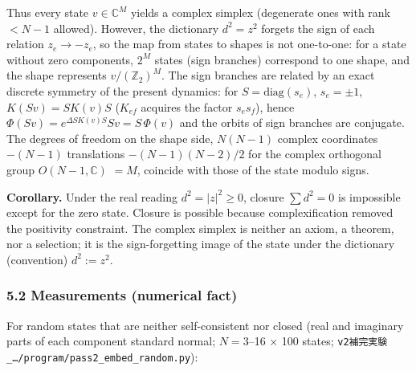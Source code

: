 \documentclass[
  10pt,
  a4paper,
]{article}
\begin{document}
Thus every state \(v\in\mathbb C^M\) yields a complex simplex
(degenerate ones with rank \(<N-1\) allowed). However, the dictionary
\(d^2=z^2\) forgets the sign of each relation \(z_e\to-z_e\), so the map
from states to shapes is not one-to-one: for a state without zero
components, \(2^M\) states (sign branches) correspond to one shape, and
the shape represents \(v/(\mathbb Z_2)^M\). The sign branches are
related by an exact discrete symmetry of the present dynamics: for
\(S=\mathrm{diag}(s_e)\), \(s_e=\pm1\), \(K(Sv)=SK(v)S\) (\(K_{ef}\)
acquires the factor \(s_es_f\)), hence
\(\Phi(Sv)=e^{\Delta SK(v)S}Sv=S\,\Phi(v)\) and the orbits of sign
branches are conjugate. The degrees of freedom on the shape side,
\(N(N-1)\) complex coordinates \(-(N-1)\) translations \(-(N-1)(N-2)/2\)
for the complex orthogonal group \(O(N-1,\mathbb C)\) \(=M\), coincide
with those of the state modulo signs.

\textbf{Corollary.} Under the real reading \(d^2=|z|^2\ge0\), closure
\(\sum d^2=0\) is impossible except for the zero state. Closure is
possible because complexification removed the positivity constraint. The
complex simplex is neither an axiom, a theorem, nor a selection; it is
the sign-forgetting image of the state under the dictionary (convention)
\(d^2:=z^2\).

\subsubsection{5.2 Measurements (numerical
fact)}\label{measurements-numerical-fact-1}

For random states that are neither self-consistent nor closed (real and
imaginary parts of each component standard normal; \(N=3\)--16 × 100
states; \texttt{v2補完実験\_…/program/pass2\_embed\_random.py}):
\end{document}

